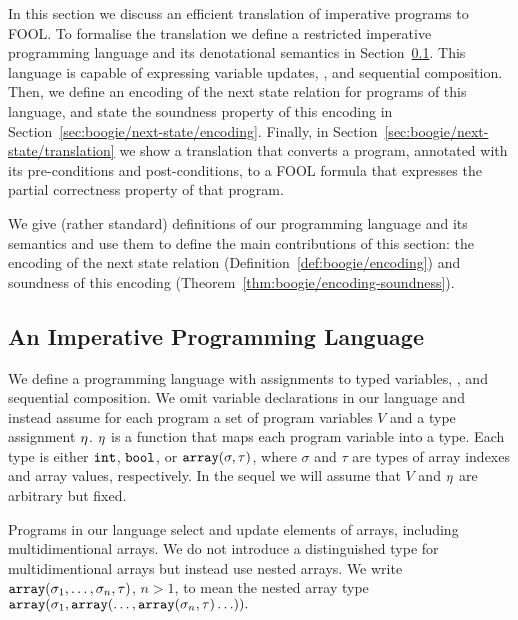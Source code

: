 In this section we discuss an efficient translation of imperative programs to FOOL. To formalise the translation we define a restricted imperative programming language and its denotational semantics in Section~\ref{sec:boogie/next-state/programming-language}. This language is capable of expressing variable updates, \ITE, and sequential composition. Then, we define an encoding of the next state relation for programs of this language, and state the soundness property of this encoding in Section~\ref{sec:boogie/next-state/encoding}. Finally, in Section~\ref{sec:boogie/next-state/translation} we show a translation that converts a program, annotated with its pre-conditions and post-conditions, to a FOOL formula that expresses the partial correctness property of that program. %

We give (rather standard) definitions of our programming language and its semantics and use them to define the main contributions of this section: the encoding of the next state relation (Definition~\ref{def:boogie/encoding}) and soundness of this encoding (Theorem~\ref{thm:boogie/encoding-soundness}).

\subsection{An Imperative Programming Language}\label{sec:boogie/next-state/programming-language}


We define a programming language with assignments to typed variables, \ITE, and sequential composition. We omit variable declarations in our language and instead assume for each program a set of program variables $V$ and a type assignment $\eta$. $\eta$ is a function that maps each program variable into a type. Each type is either $\mathtt{int}$, $\mathtt{bool}$, or $\mathtt{array}(\sigma,\tau)$, where $\sigma$ and $\tau$ are types of array indexes and array values, respectively. In the sequel we will assume that $V$ and $\eta$ are arbitrary but fixed.

Programs in our language select and update elements of arrays, including multidimentional arrays. We do not introduce a distinguished type for multidimentional arrays but instead use nested arrays. We write $\mathtt{array}(\sigma_1,\ldots,\sigma_n,\tau)$, $n > 1$, to mean the nested array type $\mathtt{array}(\sigma_1,\allowbreak\mathtt{array}(\ldots,\mathtt{array}(\sigma_n,\tau)\ldots)).$

